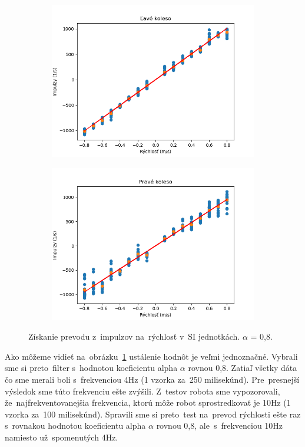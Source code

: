 \begin{figure}[!htbp]
	\begin{subfigure}{0.5\textwidth}
		\includegraphics[width=\textwidth]{img/lw_08250.png}
	\end{subfigure}
	\hfill
	\begin{subfigure}{0.5\textwidth}
		\includegraphics[width=\textwidth]{img/rw_08250.png}
	\end{subfigure}
	\caption{Získanie prevodu z~impulzov na~rýchlosť v~SI jednotkách. $\alpha$ = 0,8.}
	\label{fig:rw_lw_08250}
\end{figure}

Ako môžeme vidieť na~obrázku~\ref{fig:rw_lw_08250} ustálenie hodnôt je veľmi jednoznačné. Vybrali sme si preto~filter s~hodnotou
koeficientu alpha $\alpha$ rovnou 0,8. Zatiaľ všetky dáta čo sme merali boli s~frekvenciou 4Hz (1 vzorka za~250 milisekúnd).
Pre~presnejší výsledok sme túto frekvenciu ešte zvýšili. Z~testov robota sme vypozorovali, že~najfrekventovanejšia frekvencia,
ktorú môže robot sprostredkovať je 10Hz (1 vzorka za~100 milisekúnd). Spravili sme si preto~test na~prevod rýchlosti ešte raz
s~rovnakou hodnotou koeficientu alpha $\alpha$ rovnou 0,8, ale~s~frekvenciou 10Hz namiesto už~spomenutých 4Hz.

